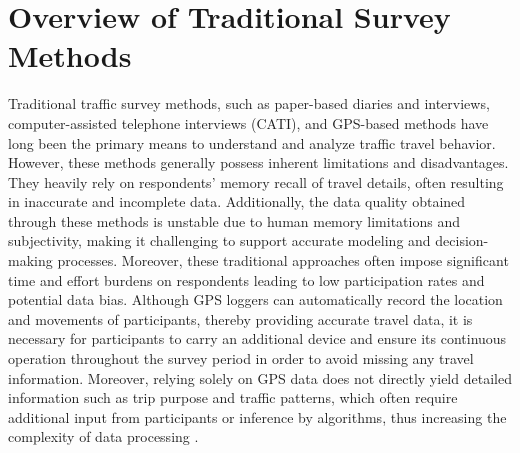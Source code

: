 \documentclass[12pt,two side]{report}
\begin{document}
\section{Overview of Traditional Survey Methods}
Traditional traffic survey methods, such as paper-based diaries and interviews, computer-assisted telephone interviews (CATI), and GPS-based methods have long been the primary means to understand and analyze traffic travel behavior\cite{alho2022online}\cite{cottrill2013future}\cite{hong2021insights}. However, these methods generally possess inherent limitations and disadvantages. They heavily rely on respondents' memory recall of travel details, often resulting in inaccurate and incomplete data\cite{hong2021insights}. Additionally, the data quality obtained through these methods is unstable due to human memory limitations and subjectivity, making it challenging to support accurate modeling and decision-making processes\cite{cottrill2013future}. Moreover, these traditional approaches often impose significant time and effort burdens on respondents leading to low participation rates and potential data bias\cite{cottrill2013future}. Although GPS loggers can automatically record the location and movements of participants, thereby providing accurate travel data, it is necessary for participants to carry an additional device and ensure its continuous operation throughout the survey period in order to avoid missing any travel information\cite{cottrill2013future}. Moreover, relying solely on GPS data does not directly yield detailed information such as trip purpose and traffic patterns, which often require additional input from participants or inference by algorithms, thus increasing the complexity of data processing \cite{hong2021insights}.
\end{document}
